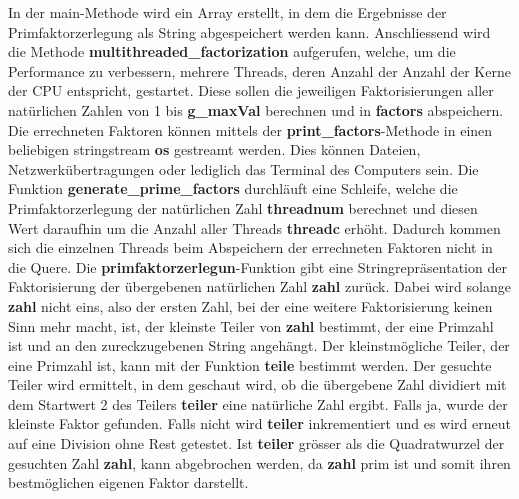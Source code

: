\newpage
In der main-Methode wird ein Array erstellt, in dem die Ergebnisse der Primfaktorzerlegung als String abgespeichert werden kann. Anschliessend wird die Methode \textbf{multithreaded\_factorization} aufgerufen, welche, um die Performance zu verbessern, mehrere Threads, deren Anzahl der Anzahl der Kerne der CPU entspricht, gestartet. Diese sollen die jeweiligen Faktorisierungen aller natürlichen Zahlen von 1 bis \textbf{g\_maxVal} berechnen und in \textbf{factors} abspeichern. Die errechneten Faktoren können mittels der \textbf{print\_factors}-Methode in einen beliebigen stringstream \textbf{os} gestreamt werden. Dies können Dateien, Netzwerkübertragungen oder lediglich das Terminal des Computers sein. Die Funktion \textbf{generate\_prime\_factors} durchläuft eine Schleife, welche die Primfaktorzerlegung der natürlichen Zahl \textbf{threadnum} berechnet und diesen Wert daraufhin um die Anzahl aller Threads \textbf{threadc} erhöht. Dadurch kommen sich die einzelnen Threads beim Abspeichern der errechneten Faktoren nicht in die Quere. Die \textbf{primfaktorzerlegun}-Funktion gibt eine Stringrepräsentation der Faktorisierung der übergebenen natürlichen Zahl \textbf{zahl} zurück. Dabei wird solange \textbf{zahl} nicht eins, also der ersten Zahl, bei der eine weitere Faktorisierung keinen Sinn mehr macht, ist, der kleinste Teiler von \textbf{zahl} bestimmt, der eine Primzahl ist und an den zureckzugebenen String angehängt. Der kleinstmögliche Teiler, der eine Primzahl ist, kann mit der Funktion \textbf{teile} bestimmt werden. Der gesuchte Teiler wird ermittelt, in dem geschaut wird, ob die übergebene Zahl dividiert mit dem Startwert 2 des Teilers \textbf{teiler} eine natürliche Zahl ergibt. Falls ja, wurde der kleinste Faktor gefunden. Falls nicht wird \textbf{teiler} inkrementiert und es wird erneut auf eine Division ohne Rest getestet. Ist \textbf{teiler} grösser als die Quadratwurzel der gesuchten Zahl \textbf{zahl}, kann abgebrochen werden, da \textbf{zahl} prim ist und somit ihren bestmöglichen eigenen Faktor darstellt.
